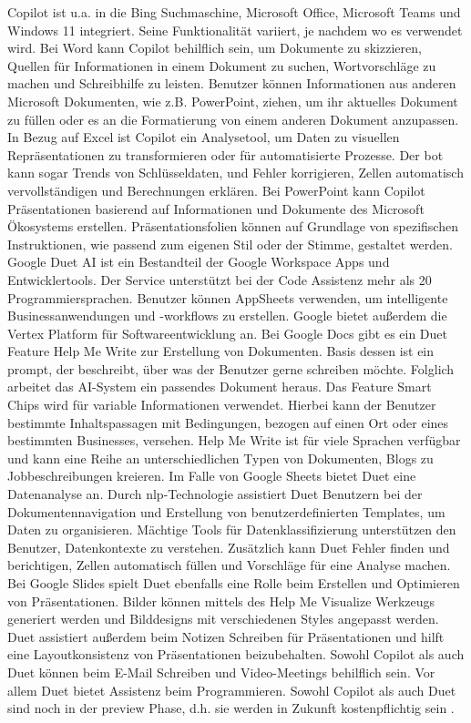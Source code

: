 Copilot ist u.a. in die Bing Suchmaschine, Microsoft Office, Microsoft Teams und Windows 11 integriert. Seine Funktionalität variiert, je nachdem wo es verwendet wird. Bei Word kann Copilot behilflich sein, um Dokumente zu skizzieren, Quellen für Informationen in einem Dokument zu suchen, Wortvorschläge zu machen und Schreibhilfe zu leisten. Benutzer können Informationen aus anderen Microsoft Dokumenten, wie z.B. PowerPoint, ziehen, um ihr aktuelles Dokument zu füllen oder es an die Formatierung von einem anderen Dokument anzupassen. In Bezug auf Excel ist Copilot ein Analysetool, um Daten zu visuellen Repräsentationen zu transformieren oder für automatisierte Prozesse. Der bot kann sogar Trends von Schlüsseldaten, und Fehler korrigieren, Zellen automatisch vervollständigen und Berechnungen erklären. Bei PowerPoint kann Copilot Präsentationen basierend auf Informationen und Dokumente des Microsoft Ökosystems erstellen. Präsentationsfolien können auf Grundlage von spezifischen Instruktionen, wie passend zum eigenen Stil oder der Stimme, gestaltet werden. Google Duet AI ist ein Bestandteil der Google Workspace Apps und Entwicklertools. Der Service unterstützt bei der Code Assistenz mehr als 20 Programmiersprachen. Benutzer können AppSheets verwenden, um intelligente Businessanwendungen und -workflows zu erstellen. Google bietet außerdem die Vertex Platform für Softwareentwicklung an. Bei Google Docs gibt es ein Duet Feature Help Me Write zur Erstellung von Dokumenten. Basis dessen ist ein prompt, der beschreibt, über was der Benutzer gerne schreiben möchte. Folglich arbeitet das AI-System ein passendes Dokument heraus. Das Feature Smart Chips wird für variable Informationen verwendet. Hierbei kann der Benutzer bestimmte Inhaltspassagen mit Bedingungen, bezogen auf einen Ort oder eines bestimmten Businesses, versehen. Help Me Write ist für viele Sprachen verfügbar und kann eine Reihe an unterschiedlichen Typen von Dokumenten, Blogs zu Jobbeschreibungen kreieren. Im Falle von Google Sheets bietet Duet eine Datenanalyse an. Durch \gls{nlp}-Technologie assistiert Duet Benutzern bei der Dokumentennavigation und Erstellung von benutzerdefinierten Templates, um Daten zu organisieren. Mächtige Tools für Datenklassifizierung unterstützen den Benutzer, Datenkontexte zu verstehen. Zusätzlich kann Duet Fehler finden und berichtigen, Zellen automatisch füllen und Vorschläge für eine Analyse machen. Bei Google Slides spielt Duet ebenfalls eine Rolle beim Erstellen und Optimieren von Präsentationen. Bilder können mittels des Help Me Visualize Werkzeugs generiert werden und Bilddesigns mit verschiedenen Styles angepasst werden. Duet assistiert außerdem beim Notizen Schreiben für Präsentationen und hilft eine Layoutkonsistenz von Präsentationen beizubehalten. Sowohl Copilot als auch Duet können beim E-Mail Schreiben und Video-Meetings behilflich sein. Vor allem Duet bietet Assistenz beim Programmieren. Sowohl Copilot als auch Duet sind noch in der preview Phase, d.h. sie werden in Zukunft kostenpflichtig sein \cite{copilot-duet}. \\
